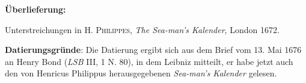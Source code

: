       
               
                \begin{ledgroupsized}[r]{120mm}
                \footnotesize 
                \pstart                
                \noindent\textbf{\"{U}berlieferung:}   
                \pend
                \end{ledgroupsized}
            
              
                            \begin{ledgroupsized}[r]{114mm}
                            \footnotesize 
                            \pstart \parindent -6mm
                            Unterstreichungen in \textsc{H. Philippes}, \cite{00002}\textit{The Sea-man's Kalender}, London 1672.\pend
                            \end{ledgroupsized}
                \vspace*{5mm}
                \begin{ledgroup}
                \footnotesize 
                \pstart
            \noindent\footnotesize{\textbf{Datierungsgr\"{u}nde}: Die Datierung ergibt sich aus dem Brief vom 13. Mai 1676 an Henry Bond\protect{} (\textit{LSB} III, 1 N. 80), in dem Leibniz mitteilt, er habe jetzt auch den von Henricus Philippus\protect{} herausgegebenen \cite{00002}\textit{Sea-man's Kalender} gelesen.}
                \pend
                \end{ledgroup}
            
